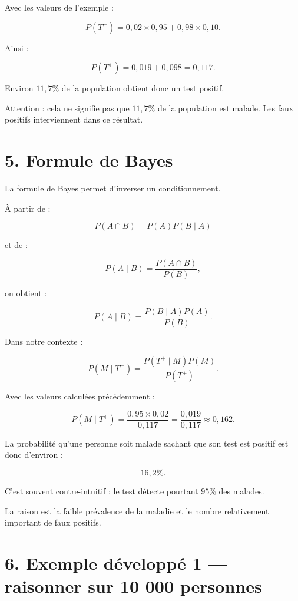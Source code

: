 Avec les valeurs de l'exemple :

\[
P(T^+)
=
0{,}02\times0{,}95
+
0{,}98\times0{,}10.
\]

Ainsi :

\[
P(T^+)=0{,}019+0{,}098=0{,}117.
\]

Environ $11{,}7\%$ de la population obtient donc un test positif.

Attention : cela ne signifie pas que $11{,}7\%$ de la population est malade. Les faux positifs interviennent dans ce résultat.



\section{5. Formule de Bayes}

La formule de Bayes permet d'inverser un conditionnement.

À partir de :

\[
P(A\cap B)=P(A)P(B\mid A)
\]

et de :

\[
P(A\mid B)=\frac{P(A\cap B)}{P(B)},
\]

on obtient :

\[
\boxed{
P(A\mid B)
=
\frac{P(B\mid A)P(A)}{P(B)}
}.
\]

Dans notre contexte :

\[
\boxed{
P(M\mid T^+)
=
\frac{P(T^+\mid M)P(M)}{P(T^+)}
}.
\]

Avec les valeurs calculées précédemment :

\[
P(M\mid T^+)
=
\frac{0{,}95\times0{,}02}{0{,}117}
=
\frac{0{,}019}{0{,}117}
\approx0{,}162.
\]

La probabilité qu'une personne soit malade sachant que son test est positif est donc d'environ :

\[
\boxed{16{,}2\%}.
\]

C'est souvent contre-intuitif : le test détecte pourtant $95\%$ des malades.

La raison est la faible prévalence de la maladie et le nombre relativement important de faux positifs.


\section{6. Exemple développé 1 — raisonner sur 10 000 personnes}

